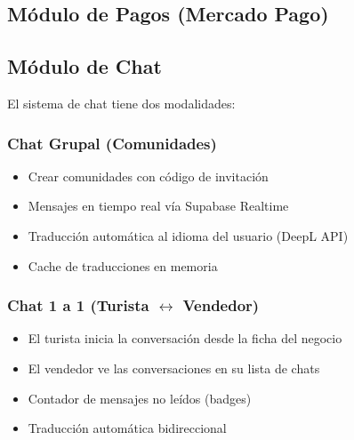 \documentclass[12pt,a4paper]{article}
\begin{document}
\subsection{M\'odulo de Pagos (Mercado Pago)}

\begin{center}
\end{center}

\subsection{M\'odulo de Chat}

El sistema de chat tiene dos modalidades:

\subsubsection{Chat Grupal (Comunidades)}
\begin{itemize}
    \item Crear comunidades con c\'odigo de invitaci\'on
    \item Mensajes en tiempo real v\'ia Supabase Realtime
    \item Traducci\'on autom\'atica al idioma del usuario (DeepL API)
    \item Cache de traducciones en memoria
\end{itemize}

\subsubsection{Chat 1 a 1 (Turista $\leftrightarrow$ Vendedor)}
\begin{itemize}
    \item El turista inicia la conversaci\'on desde la ficha del negocio
    \item El vendedor ve las conversaciones en su lista de chats
    \item Contador de mensajes no le\'idos (badges)
    \item Traducci\'on autom\'atica bidireccional
\end{itemize}
\end{document}
